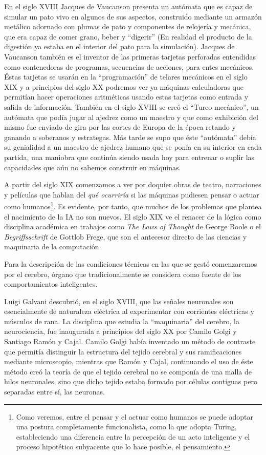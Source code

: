 \documentclass[12pt]{memoir}
\begin{document}
En el siglo XVIII Jacques de Vaucanson presenta un autómata que es capaz de simular un pato vivo en algunos de sus aspectos, construido mediante un armazón metálico adornado con plumas de pato y componentes de relojería y mecánica, que era capaz de comer grano, beber y ``digerir'' (En realidad el producto de la digestión ya estaba en el interior del pato para la simulación). Jacques de Vaucanson también es el inventor de las primeras tarjetas perforadas entendidas como contenedoras de programas, secuencias de acciones, para entes mecánicos. Éstas tarjetas se usarán en la ``programación'' de telares mecánicos en el siglo XIX y a principios del siglo XX podremos ver ya máquinas calculadoras que permitían hacer operaciones aritméticas usando estas tarjetas como entrada y salida de información. También en el siglo XVIII se creó el ``Turco mecánico'', un autómata que podía jugar al ajedrez como un maestro y que como exhibición del mismo fue enviado de gira por las cortes de Europa de la época retando y ganando a soberanos y estrategas. Más tarde se supo que éste ``autómata'' debía su genialidad a un maestro de ajedrez humano que se ponía en su interior en cada partida, una maniobra que continúa siendo usada hoy para entrenar o suplir las capacidades que aún no sabemos construir en máquinas.

A partir del siglo XIX comenzamos a ver por doquier obras de teatro, narraciones y películas que hablan del \textit{qué ocurriría} si las máquinas pudiesen pensar o actuar como humanos\footnote{Como veremos, entre el pensar y el actuar como humanos se puede adoptar una postura completamente funcionalista, como la que adopta Turing, estableciendo una diferencia entre la percepción de un acto inteligente y el proceso hipotético subyacente que lo hace posible, el pensamiento.}. Es evidente, por tanto, que muchos de los problemas que plantea el nacimiento de la IA no son nuevos. El siglo XIX ve el renacer de la lógica como disciplina académica en trabajos como \textit{The Laws of Thought} de George Boole o el \textit{Begriffsschrift} de Gottlob Frege, que son el antecesor directo de las ciencias y maquinaria de la computación.

Para la descripción de las condiciones técnicas en las que se gestó \parencite{Turing1950cmi} comenzaremos por el cerebro, órgano que tradicionalmente se considera como fuente de los comportamientos inteligentes. 

Luigi Galvani descubrió, en el siglo XVIII, que las señales neuronales son esencialmente de naturaleza eléctrica al experimentar con corrientes eléctricas y músculos de rana. La disciplina que estudia la ``maquinaria'' del cerebro, la neurociencia, fue inaugurada a principios del siglo XX por Camilo Golgi y Santiago Ramón y Cajal. Camilo Golgi había inventado un método de contraste que permitía distinguir la estructura del tejido cerebral y sus ramificaciones mediante microscopio, mientras que Ramón y Cajal, continuando el uso de éste método creó la teoría de que el tejido cerebral no se componía de una malla de hilos neuronales, sino que dicho tejido estaba formado por células contiguas pero separadas entre sí, las neuronas. 
\end{document}

